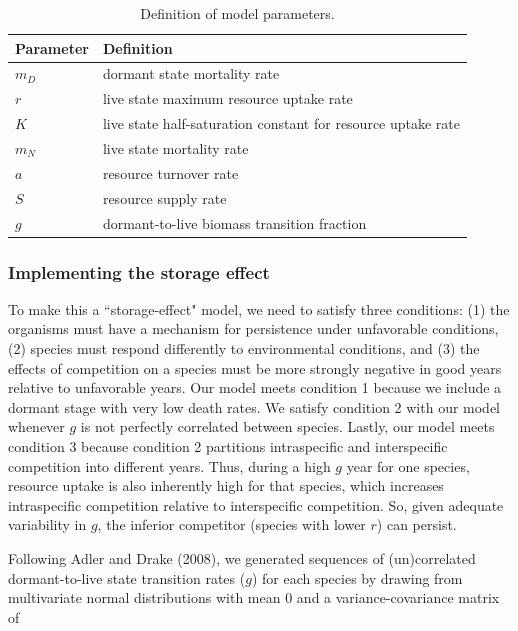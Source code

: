 \documentclass[12pt,]{article}
\begin{document}
\begin{center}
\begin{table}
\caption{Definition of model parameters.}
\begin{tabular}{l l}
\hline
Parameter & Definition \\
\hline
$m_{D}$ & dormant state mortality rate \\
$r$ & live state maximum resource uptake rate \\
$K$ & live state half-saturation constant for resource uptake rate \\
$m_{N}$ & live state mortality rate \\
$a$ & resource turnover rate \\
$S$ & resource supply rate \\
$g$ & dormant-to-live biomass transition fraction \\ 
\hline
\end{tabular}
\end{table}
\end{center}

\subsubsection{Implementing the storage
effect}\label{implementing-the-storage-effect}

To make this a ``storage-effect" model, we need to satisfy three
conditions: (1) the organisms must have a mechanism for persistence
under unfavorable conditions, (2) species must respond differently to
environmental conditions, and (3) the effects of competition on a
species must be more strongly negative in good years relative to
unfavorable years. Our model meets condition 1 because we include a
dormant stage with very low death rates. We satisfy condition 2 with our
model whenever $g$ is not perfectly correlated between species. Lastly,
our model meets condition 3 because condition 2 partitions intraspecific
and interspecific competition into different years. Thus, during a high
$g$ year for one species, resource uptake is also inherently high for
that species, which increases intraspecific competition relative to
interspecific competition. So, given adequate variability in $g$, the
inferior competitor (species with lower $r$) can persist.

Following Adler and Drake (2008), we generated sequences of
(un)correlated dormant-to-live state transition rates ($g$) for each
species by drawing from multivariate normal distributions with mean 0
and a variance-covariance matrix of
\end{document}
